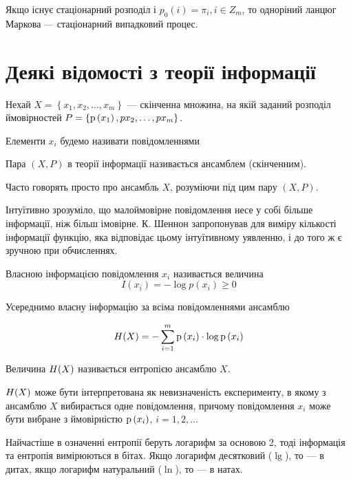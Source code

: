 Якщо існує стаціонарний розподіл  і $p_0\left( i \right) = \pi_i, i \in Z_m$,
то одноріний ланцюг Маркова --- стаціонарний випадковий процес.

\section{Деякі відомості з теорії інформації}

Нехай  $X=\left\{ x_1, x_2, \dots, x_m \right\}$ ---
скінченна множина, на якій заданий розподіл ймовірностей 
$P = \left\{ \mathrm{p}\left(x_1\right), p{x_2}, \dots, p{x_m} \right\}$.

\begin{definition}[Повідомлення]
    Елементи  $x_i$ будемо називати повідомленнями
\end{definition}

\begin{definition}
    Пара $\left( X, P \right)$ в теорії інформації
    називається ансамблем (скінченним).
\end{definition}

Часто говорять просто про ансамбль $X$, розуміючи під цим пару
$\left( X, P \right)$.

Інтуїтивно зрозуміло, що малоймовірне повідомлення несе у собі  більше
інформації, ніж більш імовірне. К. Шеннон запропонував для виміру кількості
інформації функцію, яка відповідає цьому інтуїтивному уявленню, і до того ж  є
зручною при обчисленнях.

\begin{definition}
    Власною інформацією повідомлення $x_i$ називається величина
    $$I\left(x_i\right)=-\log{p\left( x_i \right)} \ge 0$$
\end{definition}

Усереднимо власну інформацію за всіма повідомленнями ансамблю

$$H\!\left( X \right)
    = - \sum_{i=1}^m \mathrm{p}\left(x_i\right) \cdot \log{\mathrm{p}\left(x_i\right)}$$

\begin{definition}
Величина  $H\!\left( X \right)$ називається ентропією ансамблю $X$.
\end{definition}

$H\!\left( X \right)$ може бути інтерпретована як невизначеність експерименту,
в  якому  з ансамблю $X$ вибирається одне повідомлення, причому
повідомлення $x_i$ може бути вибране з ймовірністю $\mathrm{p}\left(x_i\right)$, $i=1,2,\dots$

Найчастіше в означенні ентропії
беруть логарифм за основою 2, тоді інформація та ентропія вимірюються в бітах.
Якщо логарифм десятковий ($\lg$), то --- в дитах,
якщо логарифм натуральний ($\ln$), то --- в натах.

